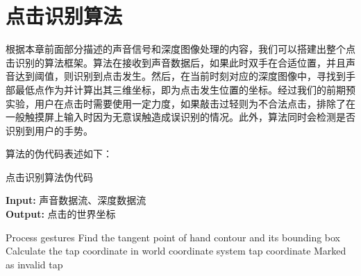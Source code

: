 \section{点击识别算法}
根据本章前面部分描述的声音信号和深度图像处理的内容，我们可以搭建出整个点击识别的算法框架。算法在接收到声音数据后，如果此时双手在合适位置，并且声音达到阈值，则识别到点击发生。然后，在当前时刻对应的深度图像中，寻找到手部最低点作为并计算出其三维坐标，即为点击发生位置的坐标。经过我们的前期预实验，用户在点击时需要使用一定力度，如果敲击过轻则为不合法点击，排除了在一般触摸屏上输入时因为无意误触造成误识别的情况。此外，算法同时会检测是否识别到用户的手势。

算法的伪代码表述如下：
\begin{algorithm}[h]
  \caption{点击识别算法伪代码} %
  \hspace*{0.02in} {\bf Input:} %
  声音数据流、深度数据流\\
  \hspace*{0.02in} {\bf Output:} %
  点击的世界坐标
  \begin{algorithmic}[1]
        \State Process gestures
      \Else
        \State Find the tangent point of hand contour and its bounding box
        \State Calculate the tap coordinate in world coordinate system
        \State \Return tap coordinate
      \EndIf
    \Else 
      \State Marked as invalid tap 
      \State \Return
    \EndIf
  \EndIf
  \end{algorithmic}
\end{algorithm}